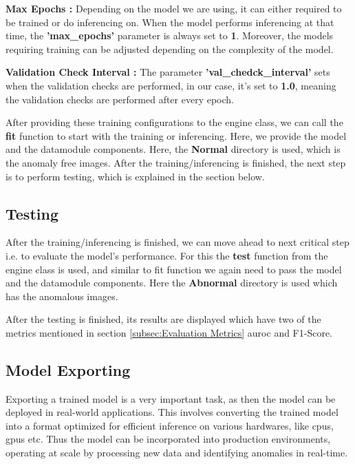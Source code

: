\textbf{Max Epochs :} Depending on the model we are using, it can either required to be trained or do inferencing on. When the model performs inferencing at that time, the \textbf{'max\_epochs'} parameter is always set to \textbf{1}. Moreover, the models requiring training can be adjusted depending on the complexity of the model.%

\textbf{Validation Check Interval :} The parameter \textbf{'val\_chedck\_interval'} sets when the validation checks are performed, in our case, it's set to \textbf{1.0}, meaning the validation checks are performed after every epoch.

After providing these training configurations to the engine class, we can call the \textbf{fit} function to start with the training or inferencing. Here, we provide the model and the datamodule components. Here, the \textbf{Normal} directory is used, which is the anomaly free images. After the training/inferencing is finished, the next step is to perform testing, which is explained in the section below.

\subsection{Testing}

After the training/inferencing is finished, we can move ahead to next critical step i.e. to evaluate the model's performance. For this the \textbf{test} function from the engine class is used, and similar to fit function we again need to pass the model and the datamodule components. Here the \textbf{Abnormal} directory is used which has the anomalous images. 

After the testing is finished, its results are displayed which have two of the metrics mentioned in section \ref{subsec:Evaluation Metrics} \gls{auroc} and F1-Score.

\subsection{Model Exporting}
\label{subsec:Model Exporting}

Exporting a trained model is a very important task, as then the model can be deployed in real-world applications. This involves converting the trained model into a format optimized for efficient inference on various hardwares, like \glspl{cpu}, \glspl{gpu} etc. Thus the model can be incorporated into production environments, operating at scale by processing new data and identifying anomalies in real-time.

